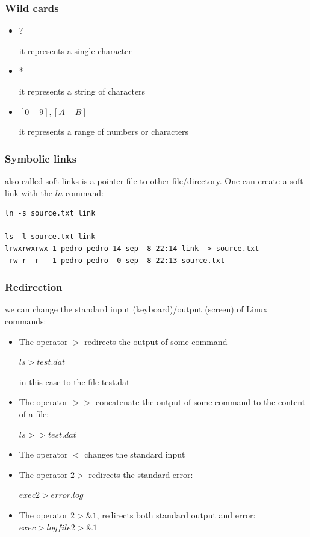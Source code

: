 \begin{frame}
	\frametitle{Wild cards}

	\begin{itemize}
        \item ?

        it represents a single character

        \item *

        it represents a string of characters
 
        \item $\left[0-9\right], \left[A-B\right]$

        it represents a range of numbers or characters
	\end{itemize}
        

\end{frame}
\begin{frame}[fragile]
	\frametitle{Symbolic links}

also called soft links is a pointer file to other file/directory. One can create
a soft link with the $ln$ command: 
        
\begin{verbatim}
ln -s source.txt link

ls -l source.txt link 
lrwxrwxrwx 1 pedro pedro 14 sep  8 22:14 link -> source.txt
-rw-r--r-- 1 pedro pedro  0 sep  8 22:13 source.txt
\end{verbatim}


\end{frame}
\begin{frame}[fragile]
	\frametitle{Redirection}

       
we can change the standard input (keyboard)/output (screen) of Linux commands:
 

\begin{itemize}
   \item The operator $>$ redirects the output of some command 

   $ls > test.dat$

   in this case to the file test.dat

   \item The operator $>>$ concatenate the output of some command to the content 
   of a file:

   $ls >> test.dat$

   \item The operator $<$ changes the standard input

   \item The operator $2>$ redirects the standard error:

   $exec 2>error.log$

   \item The operator $2>\&1$, redirects both standard output and error:
   $exec > logfile  2>\&1$
\end{itemize}


\end{frame}
